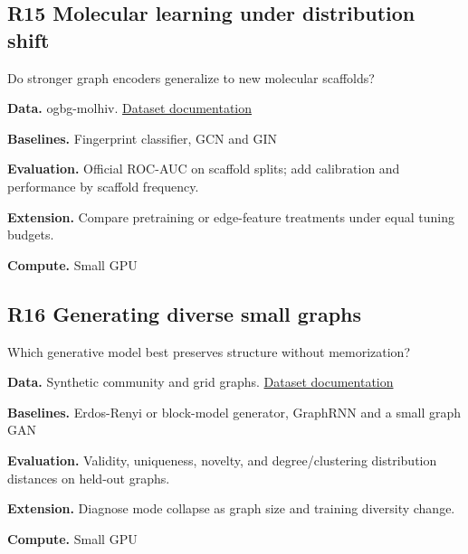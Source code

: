 \documentclass[11pt,letterpaper]{article}
\begin{document}
\begin{minipage}{\linewidth}\subsection*{R15 Molecular learning under distribution shift}
Do stronger graph encoders generalize to new molecular scaffolds?\par\textbf{Data.} ogbg-molhiv. \href{https://ogb.stanford.edu/docs/graphprop/#ogbg-molhiv}{Dataset documentation}\par
\textbf{Baselines.} Fingerprint classifier, GCN and GIN\par
\textbf{Evaluation.} Official ROC-AUC on scaffold splits; add calibration and performance by scaffold frequency.\par
\textbf{Extension.} Compare pretraining or edge-feature treatments under equal tuning budgets.\par
\textbf{Compute.} Small GPU\par
\end{minipage}\par\vspace{8pt}
\begin{minipage}{\linewidth}\subsection*{R16 Generating diverse small graphs}
Which generative model best preserves structure without memorization?\par\textbf{Data.} Synthetic community and grid graphs. \href{https://networkx.org/documentation/stable/reference/generators.html}{Dataset documentation}\par
\textbf{Baselines.} Erdos-Renyi or block-model generator, GraphRNN and a small graph GAN\par
\textbf{Evaluation.} Validity, uniqueness, novelty, and degree/clustering distribution distances on held-out graphs.\par
\textbf{Extension.} Diagnose mode collapse as graph size and training diversity change.\par
\textbf{Compute.} Small GPU\par
\end{minipage}\par\vspace{8pt}
\end{document}

